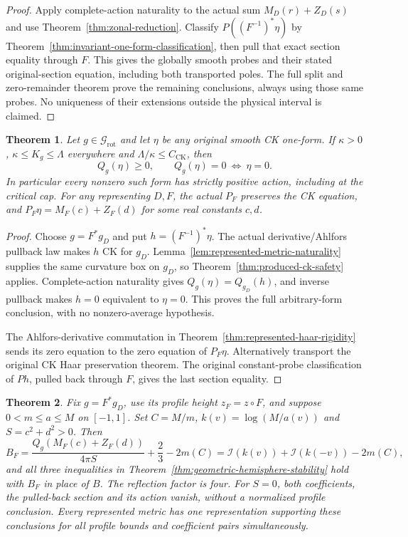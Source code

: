 \documentclass[11pt]{article}
\newtheorem{theorem}{Theorem}[section]
\newcommand{\I}{\mathcal I}
\begin{document}
\begin{proof}
Apply complete-action naturality to the actual sum $M_D(r)+Z_D(s)$
and use Theorem~\ref{thm:zonal-reduction}.
Classify $P((F^{-1})^*\eta)$ by
Theorem~\ref{thm:invariant-one-form-classification}, then pull that exact
section equality through $F$. This gives the globally smooth probes and
their stated original-section equation, including both transported poles.
The full split and zero-remainder theorem prove the remaining conclusions,
always using those same probes. No uniqueness of their extensions outside
the physical interval is claimed.
\end{proof}

\begin{theorem}\label{thm:represented-ck-safety}
Let $g\in\mathcal G_{\mathrm{rot}}$ and let $\eta$ be any original smooth
CK one-form. If $\kappa>0$, $\kappa\leq K_g\leq\Lambda$ everywhere and
$\Lambda/\kappa\leq C_{\mathrm{CK}}$, then
\[
 Q_g(\eta)\geq0,\qquad Q_g(\eta)=0\ \Longleftrightarrow\ \eta=0.
\]
In particular every nonzero such form has strictly positive action, including
at the critical cap. For any representing $D,F$, the actual $P_F$ preserves
the CK equation, and $P_F\eta=M_F(c)+Z_F(d)$ for some real constants $c,d$.
\end{theorem}

\begin{proof}
Choose $g=F^*g_D$ and put $h=(F^{-1})^*\eta$.
The actual derivative/Ahlfors pullback law makes $h$ CK for $g_D$.
Lemma~\ref{lem:represented-metric-naturality} supplies the same curvature
box on $g_D$, so Theorem~\ref{thm:produced-ck-safety} applies.
Complete-action naturality gives $Q_g(\eta)=Q_{g_D}(h)$, and inverse
pullback makes $h=0$ equivalent to $\eta=0$. This proves the full
arbitrary-form conclusion, with no nonzero-average hypothesis.

The Ahlfors-derivative commutation in
Theorem~\ref{thm:represented-haar-rigidity} sends its zero equation to the
zero equation of $P_F\eta$. Alternatively transport the original CK Haar
preservation theorem. The original constant-probe classification of $Ph$,
pulled back through $F$, gives the last section equality.
\end{proof}

\begin{theorem}\label{thm:represented-geometric-stability}
Fix $g=F^*g_D$, use its profile height $z_F=z\circ F$, and suppose
$0<m\leq a\leq M$ on $[-1,1]$. Set $C=M/m$, $k(v)=\log(M/a(v))$ and
$S=c^2+d^2>0$. Then
\begin{equation}\label{eq:represented-stability-budget}
 B_F=\frac{Q_g(M_F(c)+Z_F(d))}{4\pi S}+\frac23-2m(C)
     =\I(k(v))+\I(k(-v))-2m(C),
\end{equation}
and all three inequalities in Theorem~\ref{thm:geometric-hemisphere-stability}
hold with $B_F$ in place of $B$. The reflection factor is four.
For $S=0$, both coefficients, the pulled-back section and its action vanish,
without a normalized profile conclusion.
Every represented metric has one representation supporting these conclusions
for all profile bounds and coefficient pairs simultaneously.
\end{theorem}
\end{document}
